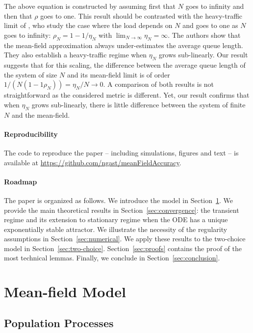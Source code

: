 \documentclass[sigconf]{acmart}
\begin{document}
The above equation is constructed by assuming first that $N$ goes to
infinity and then that $\rho$ goes to one. This result should be
contrasted with the heavy-traffic limit of
\cite{eschenfeldt2016supermarket}, who study the case where the load
depends on $N$ and goes to one as $N$ goes to infinity:
$\rho_N=1-1/\eta_N$ with $\lim_{N\to\infty}\eta_N=\infty$. The authors
show that the mean-field approximation always under-estimates the
average queue length.  They also establish a heavy-traffic regime when
$\eta_N$ grows sub-linearly.  Our result suggests that for this
scaling, the difference between the average queue length of the system
of size $N$ and its mean-field limit is of order
$1/(N(1-1\rho_N))=\eta_N/N\to0$. A comparison of both results is not
straightforward as the considered metric is different. Yet, our result
confirms that when $\eta_N$ grows sub-linearly, there is little
difference between the system of finite $N$ and the mean-field.


\newcommand\githublink{\url{https://github.com/ngast/meanFieldAccuracy}}
\paragraph*{Reproducibility} The code to reproduce the paper --
including simulations, figures and text -- is available at
\githublink. 


\paragraph*{Roadmap} The paper is organized as follows. We introduce
the model in Section~\ref{sec:model}.  We provide the main theoretical
results in Section~\ref{sec:convergence}: the transient regime and its
extension to stationary regime when the ODE has a unique exponentially
stable attractor.
We illustrate the necessity of the regularity assumptions in
Section~\ref{sec:numerical}. We apply these results to the two-choice
model in Section~\ref{sec:two-choice}. Section~\ref{sec:proofs}
contains the proof of the most technical lemmas. 
Finally, we conclude
in Section~\ref{sec:conclusion}.



\section{Mean-field Model}
\label{sec:model}


\subsection{Population Processes}
\end{document}
